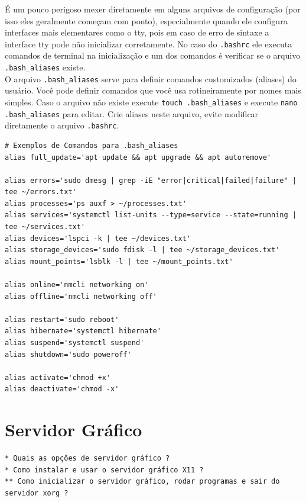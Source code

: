 \documentclass[12pt,a4paper]{article}
\begin{document}
É um pouco perigoso mexer diretamente em alguns arquivos de configuração (por isso eles geralmente começam com ponto), especialmente quando ele configura interfaces mais elementares como o tty, pois em caso de erro de sintaxe a interface tty pode não inicializar corretamente. No caso do \texttt{.bashrc} ele executa comandos de terminal na inicialização e um dos comandos é verificar se o arquivo \texttt{.bash\_aliases} existe. \\

O arquivo \texttt{.bash\_aliases} serve para definir comandos customizados (aliases) do usuário. Você pode definir comandos que você usa rotineiramente por nomes mais simples. Caso o arquivo não existe execute \texttt{touch .bash\_aliases} e execute \texttt{nano .bash\_aliases} para editar. Crie aliases neste arquivo, evite modificar diretamente o arquivo \texttt{.bashrc}. \\

\begin{lstlisting}
# Exemplos de Comandos para .bash_aliases
alias full_update='apt update && apt upgrade && apt autoremove'

alias errors='sudo dmesg | grep -iE "error|critical|failed|failure" | tee ~/errors.txt'
alias processes='ps auxf > ~/processes.txt'
alias services='systemctl list-units --type=service --state=running | tee ~/services.txt'
alias devices='lspci -k | tee ~/devices.txt'
alias storage_devices='sudo fdisk -l | tee ~/storage_devices.txt'
alias mount_points='lsblk -l | tee ~/mount_points.txt'

alias online='nmcli networking on'
alias offline='nmcli networking off'

alias restart='sudo reboot'
alias hibernate='systemctl hibernate'
alias suspend='systemctl suspend'
alias shutdown='sudo poweroff'

alias activate='chmod +x'
alias deactivate='chmod -x'
\end{lstlisting}


\section{Servidor Gráfico}

\begin{lstlisting}
* Quais as opções de servidor gráfico ?
* Como instalar e usar o servidor gráfico X11 ?
** Como inicializar o servidor gráfico, rodar programas e sair do servidor xorg ?
\end{lstlisting}
\end{document}
